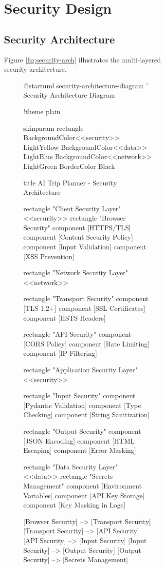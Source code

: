 \documentclass[12pt,a4paper]{report}
\begin{document}
\begin{figure}[H]
\begin{plantuml}
\begin{figure}[H]
\begin{plantuml}
\chapter{Security Design}

\section{Security Architecture}

Figure \ref{fig:security-arch} illustrates the multi-layered security architecture.

\begin{figure}[H]
    \centering
    \begin{plantuml}
@startuml security-architecture-diagram
' Security Architecture Diagram

!theme plain

skinparam rectangle {
    BackgroundColor<<security>> LightYellow
    BackgroundColor<<data>> LightBlue
    BackgroundColor<<network>> LightGreen
    BorderColor Black
}

title AI Trip Planner - Security Architecture

rectangle "Client Security Layer" <<security>> {
    rectangle "Browser Security" {
        component [HTTPS/TLS]
        component [Content Security Policy]
        component [Input Validation]
        component [XSS Prevention]
    }
}

rectangle "Network Security Layer" <<network>> {
    rectangle "Transport Security" {
        component [TLS 1.2+]
        component [SSL Certificates]
        component [HSTS Headers]
    }
    
    rectangle "API Security" {
        component [CORS Policy]
        component [Rate Limiting]
        component [IP Filtering]
    }
}

rectangle "Application Security Layer" <<security>> {
    rectangle "Input Security" {
        component [Pydantic Validation]
        component [Type Checking]
        component [String Sanitization]
    }
    
    rectangle "Output Security" {
        component [JSON Encoding]
        component [HTML Escaping]
        component [Error Masking]
    }
}

rectangle "Data Security Layer" <<data>> {
    rectangle "Secrets Management" {
        component [Environment Variables]
        component [API Key Storage]
        component [Key Masking in Logs]
    }
}

[Browser Security] --> [Transport Security]
[Transport Security] --> [API Security]
[API Security] --> [Input Security]
[Input Security] --> [Output Security]
[Output Security] --> [Secrets Management]


\end{plantuml}
\end{figure}
\end{plantuml}
\end{figure}
\end{plantuml}
\end{figure}
\end{document}
